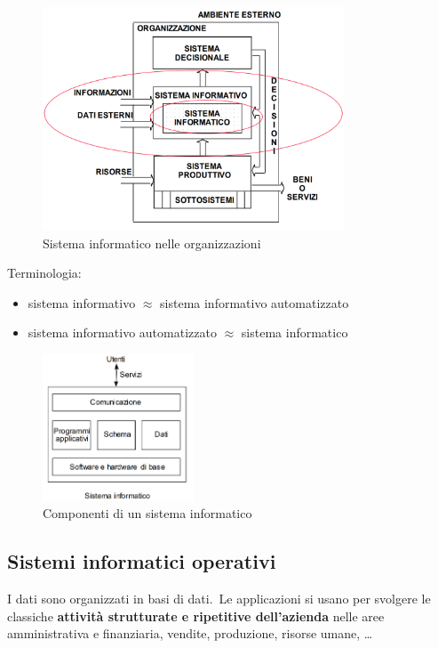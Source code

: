 \begin{figure}[H]
	\centering
	\includegraphics[width=0.8\textwidth]{immagini/Sistemi_informatici.png}
	\caption*{Sistema informatico nelle organizzazioni}
\end{figure}
\noindent Terminologia:
\begin{itemize}
	\item sistema informativo $\approx$ sistema informativo automatizzato
	\item sistema informativo automatizzato $\approx$ sistema informatico
\end{itemize}

\begin{figure}[H]
	\centering
	\includegraphics[width=0.4\textwidth]{immagini/Sistema_informatico.png}
	\caption*{Componenti di un sistema informatico}
\end{figure}
\subsection{Sistemi informatici operativi}
I dati sono organizzati in basi di dati.\
Le applicazioni si usano per svolgere le classiche \textbf{attività strutturate e ripetitive dell'azienda} nelle aree amministrativa e finanziaria, vendite, produzione, risorse umane, \dots

